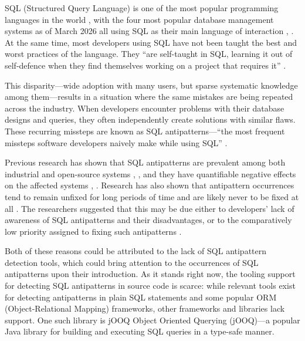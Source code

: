 SQL (Structured Query Language) is one of the most popular programming languages in the world , with the four most popular database management systems as of March 2026 all using SQL as their main language of interaction , . At the same time, most developers using SQL have not been taught the best and worst practices of the language. They “are self-taught in SQL, learning it out of self-defence when they find themselves working on a project that requires it” .

This disparity—wide adoption with many users, but sparse systematic knowledge among them—results in a situation where the same mistakes are being repeated across the industry. When developers encounter problems with their database designs and queries, they often independently create solutions with similar flaws. These recurring missteps are known as SQL antipatterns—“the most frequent missteps software developers naively make while using SQL” .

Previous research has shown that SQL antipatterns are prevalent among both industrial and open-source systems , , and they have quantifiable negative effects on the affected systems , .
Research has also shown that antipattern occurrences tend to remain unfixed for long periods of time and are likely never to be fixed at all . The researchers suggested that this may be due either to developers’ lack of awareness of SQL antipatterns and their disadvantages, or to the comparatively low priority assigned to fixing such antipatterns .

Both of these reasons could be attributed to the lack of SQL antipattern detection tools, which could bring attention to the occurrences of SQL antipatterns upon their introduction. As it stands right now, the tooling support for detecting SQL antipatterns in source code is scarce: while relevant tools exist for detecting antipatterns in plain SQL statements and some popular ORM (Object-Relational Mapping) frameworks, other frameworks and libraries lack support. One such library is jOOQ Object Oriented Querying (jOOQ)—a popular Java library for building and executing SQL queries in a type-safe manner. 

